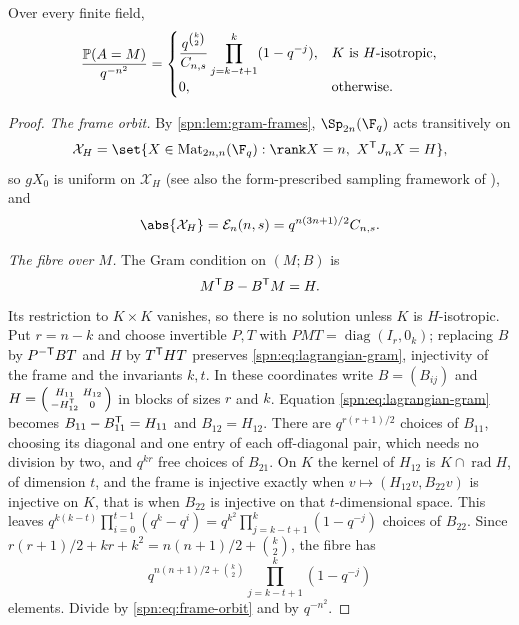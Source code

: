 \begin{corollary}\label{spn:thm:lagrangian}
Over every finite field,
\begin{equation}\label{spn:eq:lagrangian-density}
 \frac{\mathbb{P}(A=M)}{q^{-n^2}}=
 \begin{cases}
 \dfrac{q^{\binom k2}}{C_{n,s}}\displaystyle\prod_{j=k-t+1}^{k}(1-q^{-j}),
 &K\text{ is $H$-isotropic},\\[8pt]
 0,&\text{otherwise}.
 \end{cases}
\end{equation}
\end{corollary}

\begin{proof}
\emph{The frame orbit.} By \cref{spn:lem:gram-frames}, $\Sp_{2n}(\F_q)$ acts transitively on
\[
 \mathcal X_H=\set{X\in\spnMat_{2n,n}(\F_q):\rank X=n,\ X^{\spnT}J_nX=H},
\]
so $gX_0$ is uniform on $\mathcal X_H$ (see also the form-prescribed sampling framework of
\cite{Ishizuka2026Uniform}), and
\begin{equation}\label{spn:eq:frame-orbit}
 \abs{\mathcal X_H}=\spnEmb_n(n,s)=q^{n(3n+1)/2}C_{n,s}.
\end{equation}

\emph{The fibre over $M$.} The Gram condition on $(M;B)$ is
\begin{equation}\label{spn:eq:lagrangian-gram}
 M^{\mathsf{T}}B-B^{\mathsf{T}}M=H .
\end{equation}
Its restriction to $K\times K$ vanishes, so there is no solution unless $K$ is
$H$-isotropic. Put $r=n-k$ and choose invertible $P,T$ with
$PMT=\operatorname{diag}(I_r,0_k)$; replacing $B$ by $P^{-\mathsf{T}}BT$ and $H$ by $T^{\mathsf{T}}HT$
preserves \eqref{spn:eq:lagrangian-gram}, injectivity of the frame and the invariants $k,t$. In
these coordinates write $B=(B_{ij})$ and
$H=\left(\begin{smallmatrix}H_{11}&H_{12}\\-H_{12}^{\mathsf{T}}&0\end{smallmatrix}\right)$ in blocks
of sizes $r$ and $k$. Equation \eqref{spn:eq:lagrangian-gram} becomes
$B_{11}-B_{11}^{\mathsf{T}}=H_{11}$ and $B_{12}=H_{12}$. There are $q^{r(r+1)/2}$ choices of
$B_{11}$, choosing its diagonal and one entry of each off-diagonal pair, which needs no
division by two, and $q^{kr}$ free choices of $B_{21}$. On $K$ the kernel of $H_{12}$ is
$K\cap\operatorname{rad}H$, of dimension $t$, and the frame is injective exactly when
$v\mapsto(H_{12}v,B_{22}v)$ is injective on $K$, that is when $B_{22}$ is injective on that
$t$-dimensional space. This leaves $q^{k(k-t)}\prod_{i=0}^{t-1}(q^k-q^i)
=q^{k^2}\prod_{j=k-t+1}^k(1-q^{-j})$ choices of $B_{22}$. Since
$r(r+1)/2+kr+k^2=n(n+1)/2+\binom k2$, the fibre has
\[
 q^{n(n+1)/2+\binom k2}\prod_{j=k-t+1}^k(1-q^{-j})
\]
elements. Divide by \eqref{spn:eq:frame-orbit} and by $q^{-n^2}$.
\end{proof}


